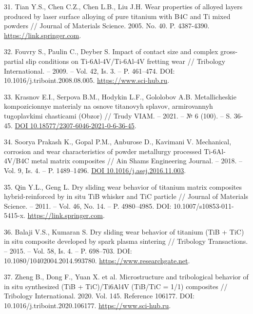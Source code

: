\begin{references}
31. Tian Y.S., Chen C.Z., Chen L.B., Liu J.H. Wear properties of
alloyed layers produced by laser surface alloying of pure titanium
with B4C and Ti mixed powders // Journal of Materials
Science. 2005. No. 40. P. 4387-4390. \href{https://link.springer.com/article/10.1007/s10853-005-0736-2}{https://link.springer.com}.

32. Fouvry S., Paulin C., Deyber S. Impact of contact size and complex
gross-partial slip conditions on Ti-6Al-4V/Ti-6Al-4V fretting wear //
Tribology International. – 2009. – Vol. 42, Is. 3. – P. 461–474. DOI:
10.1016/j.triboint.2008.08.005. \href{https://www.sci-hub.ru/10.1016/j.triboint.2008.08.005?ysclid=m87mkr00fc385128516}{https://www.sci-hub.ru}.

33. Krasnov E.I., Serpova B.M., Hodykin L.F., Gololobov
A.B. Metallicheskie kompozicionnye materialy na osnove titanovyh
splavov, armirovannyh tugoplavkimi chasticami (Obzor) // Trudy VIAM. –
2021. – № 6 (100). –
S. 36-45. \href{https://dx.doi.org/10.18577/2307-6046-2021-0-6-36-45}{DOI 10.18577/2307-6046-2021-0-6-36-45}.

34. Soorya Prakash K., Gopal P.M., Anburose D., Kavimani
V. Mechanical, corrosion and wear character\-istics of powder metallurgy
processed Ti-6Al-4V/B4C metal matrix composites // Ain Shams
Engineering Journal. – 2018. – Vol. 9, Is. 4. –
P. 1489–1496. \href{https://doi.org/10.1016/j.asej.2016.11.003}{DOI 10.1016/j.asej.2016.11.003}.

35. Qin Y.L., Geng L. Dry sliding wear behavior of titanium matrix
composites hybrid-reinforced by in situ TiB whisker and TiC particle
// Journal of Materials Science. – 2011. – Vol. 46, No. 14. –
P. 4980–4985. DOI:
10.1007/s10853-011-5415-x. \href{https://link.springer.com/article/10.1007/s10853-011-5415-x}{https://link.springer.com}.

36. Balaji V.S., Kumaran S. Dry sliding wear behavior of titanium (TiB
+ TiC) in situ composite developed by spark plasma sintering //
Tribology Transactions. – 2015. – Vol. 58, Is. 4. – P. 698–703. DOI:\\
10.1080/10402004.2014.993780. \href{https://www.researchgate.net/publication/276508350_Dry_Sliding_Wear_Behavior_of_Titanium-TiBTiC_in_situ_Composite_Developed_by_Spark_Plasma_Sintering}{https://www.researchgate.net}.

37. Zheng B., Dong F., Yuan X. et al. Microstructure and tribological
behavior of in situ synthesized (TiB + TiC)/Ti6Al4V (TiB/TiC = 1/1)
composites // Tribology International. 2020. Vol. 145. Reference
106177. DOI:
10.1016/j.triboint.2020.106177. \href{https://www.sci-hub.ru/10.1016/j.triboint.2020.106177?ysclid=m836h762qf658864232}{https://www.sci-hub.ru}.


\end{references}
